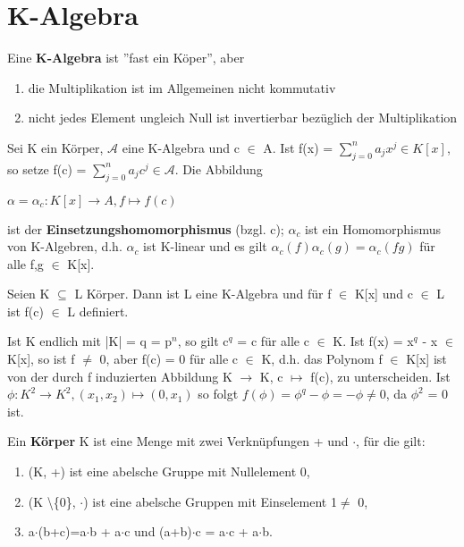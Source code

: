 \section{K-Algebra}
Eine \textbf{K-Algebra} ist ”fast ein Köper”, aber
\begin{enumerate}
\item die Multiplikation ist im Allgemeinen nicht kommutativ
\item nicht jedes Element ungleich Null ist invertierbar bezüglich der Multiplikation\\
\end{enumerate}

\begin{definition}
Sei K ein Körper, $\mathcal{A}$ eine K-Algebra und c $\in$ A. Ist f(x) = $\sum\nolimits_{j=0}^{n} a_j x^j \in K[x]$, so setze f(c) = $\sum\nolimits_{j=0}^{n} a_j c^j \in \mathcal{A}$. Die Abbildung
\begin{center}
$\alpha = \alpha_c: K[x] \to A, f \mapsto f(c)$
\end{center}
ist der \textbf{Einsetzungshomomorphismus} (bzgl. c); $\alpha_c$ ist ein Homomorphismus von K-Algebren, d.h. $\alpha_c$ ist K-linear und es gilt $\alpha_c(f)\alpha_c(g) = \alpha_c(fg)$ für alle f,g $\in$ K[x].
\end{definition}

\begin{example}
\leavevmode
\begin{compactenum}
\item Seien K $\subseteq$ L Körper. Dann ist L eine K-Algebra und für f $\in$ K[x] und c $\in$ L ist f(c) $\in$ L definiert.
\item Ist K endlich mit |K| = q = p$^n$, so gilt c$^q$ = c für alle c $\in$ K. Ist f(x) = x$^q$ - x $\in$ K[x], so ist f $\neq$ 0, aber f(c) = 0 für alle c $\in$ K, d.h. das Polynom f $\in$ K[x] ist von der durch f induzierten Abbildung K $\to$ K, c $\mapsto$ f(c), zu unterscheiden. Ist $\phi: K^2 \to K^2, (x_1,x_2) \mapsto (0,x_1)$ so folgt $f(\phi) = \phi^q - \phi = -\phi \neq 0$, da $\phi^2$ = 0 ist.
\end{compactenum}
\end{example}

\begin{definition}
Ein \textbf{Körper} K ist eine Menge mit zwei Verknüpfungen + und $\cdot$, für die gilt:
\begin{enumerate}
\item (K, +) ist eine abelsche Gruppe mit Nullelement 0,
\item (K \textbackslash \{0\}, $\cdot$) ist eine abelsche Gruppen mit Einselement 1$\neq$ 0,
\item a$\cdot$(b+c)=a$\cdot$b + a$\cdot$c und (a+b)$\cdot$c = a$\cdot$c + a$\cdot$b.
\end{enumerate}
\end{definition}

